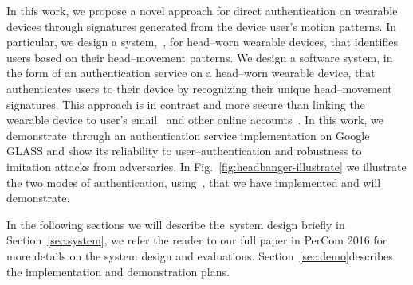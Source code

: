 In this work, we propose a novel approach for direct authentication on wearable devices through signatures generated from the device user's motion patterns. In particular, we design a system,~\systemname, for head--worn wearable devices, that identifies users based on their head--movement patterns. We design a software system, in the form of an authentication service on a head--worn wearable device, that authenticates users to their device by recognizing their unique head--movement signatures. This approach is in contrast and more secure than linking the wearable device to user's email~\cite{googleglass} and other online accounts~\cite{fitbit}. In this work, we demonstrate~\systemname through an authentication service implementation on Google GLASS and show its reliability to user--authentication and robustness to imitation attacks from adversaries. In Fig.~\ref{fig:headbanger-illustrate} we illustrate the two modes of authentication, using~\systemname, that we have implemented and will demonstrate.

In the following sections we will describe the~\systemname system design briefly in Section~\ref{sec:system}, we refer the reader to our full paper in PerCom 2016 for more details on the system design and evaluations. Section~\ref{sec:demo}describes the implementation and demonstration plans.

